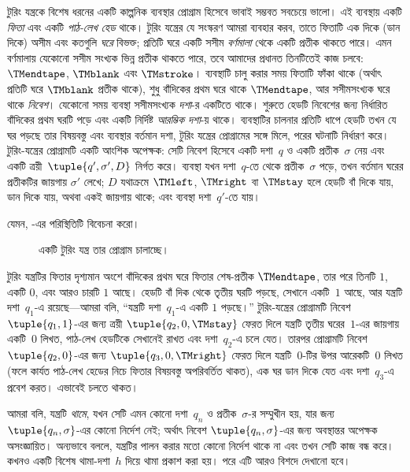 \documentclass[../../../include/open-logic-section]{subfiles}
\begin{document}
\begin{explain}
টুরিং যন্ত্রকে বিশেষ ধরনের একটি কাল্পনিক ব্যবস্থার প্রোগ্রাম হিসেবে ভাবাই
সম্ভবত সবচেয়ে ভালো। এই ব্যবস্থায় একটি \emph{ফিতা} এবং একটি
\emph{পাঠ-লেখ হেড} থাকে। টুরিং যন্ত্রের যে সংস্করণ আমরা ব্যবহার করব,
তাতে ফিতাটি এক দিকে (ডান দিকে) অসীম এবং কতগুলি \emph{ঘরে} বিভক্ত;
প্রতিটি ঘরে একটি সসীম \emph{বর্ণমালা} থেকে একটি প্রতীক থাকতে পারে। এমন
বর্ণমালায় যেকোনো সসীম সংখ্যক ভিন্ন প্রতীক থাকতে পারে, তবে আমাদের প্রধানত
তিনটিতেই কাজ চলবে: $\TMendtape$, $\TMblank$ এবং $\TMstroke$। ব্যবস্থাটি
চালু করার সময় ফিতাটি ফাঁকা থাকে (অর্থাৎ প্রতিটি ঘরে $\TMblank$ প্রতীক
থাকে), শুধু বাঁদিকের প্রথম ঘরে থাকে $\TMendtape$, আর সসীমসংখ্যক ঘরে থাকে
\emph{নিবেশ}। যেকোনো সময় ব্যবস্থা সসীমসংখ্যক \emph{দশা}-র একটিতে থাকে।
শুরুতে হেডটি নিবেশের জন্য নির্ধারিত বাঁদিকের প্রথম ঘরটি পড়ে এবং একটি
নির্দিষ্ট \emph{আরম্ভিক দশা}-য় থাকে। ব্যবস্থাটির চালনার প্রতিটি ধাপে
হেডটি তখন যে ঘর পড়ছে তার বিষয়বস্তু এবং ব্যবস্থার বর্তমান দশা, টুরিং
যন্ত্রের প্রোগ্রামের সঙ্গে মিলে, পরের ঘটনাটি নির্ধারণ করে। টুরিং-যন্ত্রের
প্রোগ্রামটি একটি আংশিক অপেক্ষক: সেটি নিবেশ হিসেবে একটি দশা~$q$ ও একটি
প্রতীক~$\sigma$ নেয় এবং একটি ত্রয়ী~$\tuple{q', \sigma', D}$ নির্গত
করে। ব্যবস্থা যখন দশা~$q$-তে থেকে প্রতীক~$\sigma$ পড়ে, তখন বর্তমান
ঘরের প্রতীকটির জায়গায় $\sigma'$ লেখে; $D$ যথাক্রমে $\TMleft$,
$\TMright$ বা $\TMstay$ হলে হেডটি বাঁ দিকে যায়, ডান দিকে যায়, অথবা
একই জায়গায় থাকে; এবং ব্যবস্থা দশা~$q'$-তে যায়।


যেমন, -এর পরিস্থিতিটি বিবেচনা করো।
\begin{figure}
  \caption{একটি টুরিং যন্ত্র তার প্রোগ্রাম চালাচ্ছে।}
\end{figure}
টুরিং যন্ত্রটির ফিতার দৃশ্যমান অংশে বাঁদিকের প্রথম ঘরে ফিতার শেষ-প্রতীক
$\TMendtape$, তার পরে তিনটি $1$, একটি $0$, এবং আরও চারটি $1$ আছে। হেডটি
বাঁ দিক থেকে তৃতীয় ঘরটি পড়ছে, সেখানে একটি~$1$ আছে, আর যন্ত্রটি
দশা~$q_1$-এ রয়েছে—আমরা বলি, “যন্ত্রটি দশা~$q_1$-এ একটি $1$ পড়ছে।”
টুরিং-যন্ত্রের প্রোগ্রামটি নিবেশ $\tuple{q_1, 1}$-এর জন্য ত্রয়ী
$\tuple{q_2, 0, \TMstay}$ ফেরত দিলে যন্ত্রটি তৃতীয় ঘরের~$1$-এর জায়গায়
একটি~$0$ লিখত, পাঠ-লেখ হেডটিকে সেখানেই রাখত এবং দশা~$q_2$-এ চলে যেত।
তারপর প্রোগ্রামটি নিবেশ $\tuple{q_2, 0}$-এর জন্য
$\tuple{q_3, 0, \TMright}$ ফেরত দিলে যন্ত্রটি~$0$-টির উপর আরেকটি~$0$
লিখত (ফলে কার্যত পাঠ-লেখ হেডের নিচে ফিতার বিষয়বস্তু অপরিবর্তিত থাকত),
এক ঘর ডান দিকে যেত এবং দশা~$q_3$-এ প্রবেশ করত। এভাবেই চলতে থাকত।

আমরা বলি, যন্ত্রটি \emph{থামে}, যখন সেটি এমন কোনো দশা~$q_n$ ও
প্রতীক~$\sigma$-র সম্মুখীন হয়, যার জন্য $\tuple{q_n, \sigma}$-এর কোনো
নির্দেশ নেই; অর্থাৎ নিবেশ $\tuple{q_n,\sigma}$-এর জন্য অবস্থান্তর অপেক্ষক
অসংজ্ঞায়িত। অন্যভাবে বললে, যন্ত্রটির পালন করার মতো কোনো নির্দেশ থাকে না
এবং তখন সেটি কাজ বন্ধ করে। কখনও একটি বিশেষ থামা-দশা~$h$ দিয়ে থামা
প্রকাশ করা হয়। পরে এটি আরও বিশদে দেখানো হবে।
\end{explain}
\end{document}
